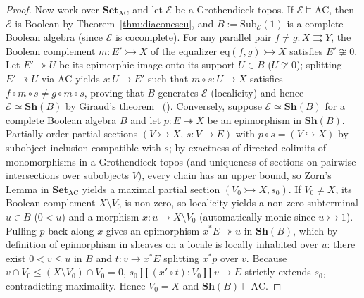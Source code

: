 \documentclass[10pt,twoside,openright]{book}
\theoremstyle{crmplain}
\theoremstyle{crmdef}
\theoremstyle{crmremark}
\begin{document}
\begin{proof}
Now work over $\mathbf{Set}_{\mathrm{AC}}$ and let $\mathcal{E}$ be a Grothendieck topos. If $\mathcal{E} \models \mathrm{AC}$, then $\mathcal{E}$ is Boolean by Theorem~\ref{thm:diaconescu}, and $B := \mathrm{Sub}_{\mathcal{E}}(1)$ is a complete Boolean algebra (since $\mathcal{E}$ is cocomplete). For any parallel pair $f \neq g : X \rightrightarrows Y$, the Boolean complement $m : E' \rightarrowtail X$ of the equalizer $\mathrm{eq}(f, g) \rightarrowtail X$ satisfies $E' \not\cong 0$. Let $E' \twoheadrightarrow U$ be its epimorphic image onto its support $U \in B$ ($U \not\cong 0$); splitting $E' \twoheadrightarrow U$ via $\mathrm{AC}$ yields $s : U \to E'$ such that $m \circ s : U \to X$ satisfies $f \circ m \circ s \neq g \circ m \circ s$, proving that $B$ generates $\mathcal{E}$ (localicity) and hence $\mathcal{E} \simeq \mathbf{Sh}(B)$ by Giraud's theorem~\cite[Ch.~IX, \S 5]{MacLaneMoerdijk92} (\cite[\S D4.5]{Johnstone02}). Conversely, suppose $\mathcal{E} \simeq \mathbf{Sh}(B)$ for a complete Boolean algebra $B$ and let $p : E \twoheadrightarrow X$ be an epimorphism in $\mathbf{Sh}(B)$. Partially order partial sections $(V \rightarrowtail X,\, s : V \to E)$ with $p \circ s = (V \hookrightarrow X)$ by subobject inclusion compatible with $s$; by exactness of directed colimits of monomorphisms in a Grothendieck topos (and uniqueness of sections on pairwise intersections over subobjects $V$), every chain has an upper bound, so Zorn's Lemma in $\mathbf{Set}_{\mathrm{AC}}$ yields a maximal partial section $(V_0 \rightarrowtail X, s_0)$. If $V_0 \neq X$, its Boolean complement $X \setminus V_0$ is non-zero, so localicity yields a non-zero subterminal $u \in B$ ($0 < u$) and a morphism $x : u \to X \setminus V_0$ (automatically monic since $u \rightarrowtail 1$). Pulling $p$ back along $x$ gives an epimorphism $x^* E \twoheadrightarrow u$ in $\mathbf{Sh}(B)$, which by definition of epimorphism in sheaves on a locale is locally inhabited over $u$: there exist $0 < v \le u$ in $B$ and $t : v \to x^* E$ splitting $x^* p$ over $v$. Because $v \cap V_0 \le (X \setminus V_0) \cap V_0 = 0$, $s_0 \amalg (x' \circ t) : V_0 \amalg v \to E$ strictly extends $s_0$, contradicting maximality. Hence $V_0 = X$ and $\mathbf{Sh}(B) \models \mathrm{AC}$.
\end{proof}
\end{document}
